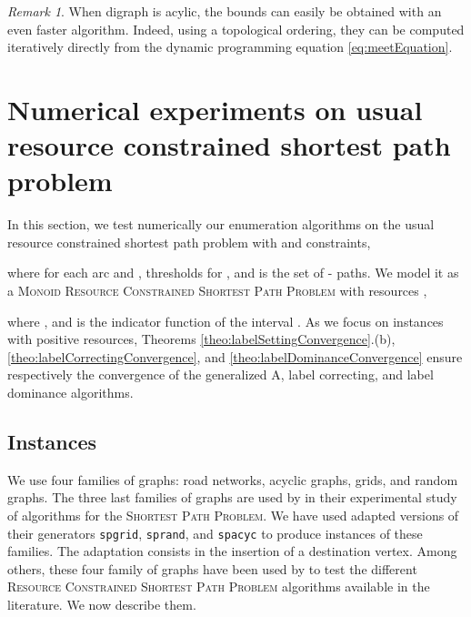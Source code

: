 \documentclass[11pt]{amsart}
\theoremstyle{plain}
\theoremstyle{remark}
\newtheorem{rem}{Remark}
\newcommand{\SP}{\textsc{Shortest Path Problem}\xspace}
\newcommand{\RCSP}{\textsc{Resource Constrained Shortest Path Problem}\xspace}
\newcommand{\MRCSP}{\textsc{Monoid Resource Constrained Shortest Path Problem}\xspace}
\begin{document}
\begin{rem}\label{rem:acyclicBounds}
 When digraph  is acylic, the bounds  can easily be obtained with an even faster algorithm. Indeed, using a topological ordering, they can be computed iteratively directly from the dynamic programming equation \eqref{eq:meetEquation}.
\end{rem}


\section{Numerical experiments on usual resource constrained shortest path problem} \label{sec:numerical_experiments_on_usual_resource_constrained_shortest_path_problem}
In this section, we test numerically our enumeration algorithms on the usual resource constrained shortest path problem with  and  constraints, 

where  for each arc  and , thresholds  for , and  is the set of - paths. We model it as a \MRCSP with resources , 

where , and  is the indicator function of the interval . As we focus on instances with positive resources, Theorems \ref{theo:labelSettingConvergence}.(b), \ref{theo:labelCorrectingConvergence}, and \ref{theo:labelDominanceConvergence} ensure respectively the convergence of the generalized A, label correcting, and label dominance algorithms.




\subsection{Instances} \label{sub:instances}
We use four families of graphs: road networks, acyclic graphs, grids, and random graphs. The three last families of graphs are used by \citet{cherkassky1996shortest} in their experimental study of algorithms for the \SP. We have used adapted versions of their generators \texttt{spgrid}, \texttt{sprand}, and \texttt{spacyc} to produce instances of these families. The adaptation consists in the insertion of a destination vertex. Among others, these four family of graphs have been used by \citet{dumitrescu2003improved} to test the different \RCSP algorithms available in the literature. We now describe them.
\end{document}
